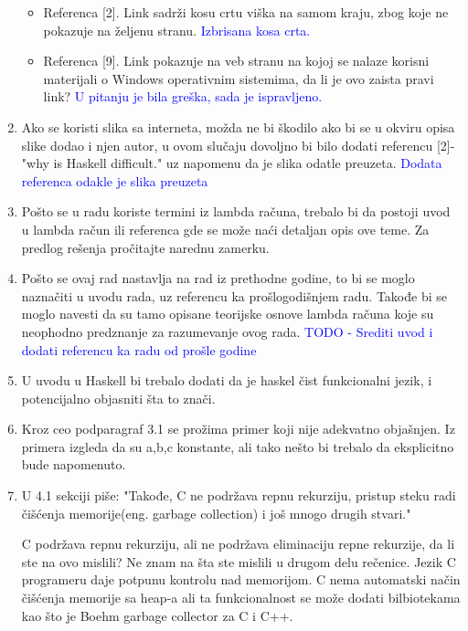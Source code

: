 \documentclass[a4paper]{report}
\newcommand{\odgovor}[1]{\textcolor{blue}{#1}}
\begin{document}
\begin{enumerate}
\begin{itemize}
			\item Referenca [2]. Link sadrži kosu crtu viška na samom kraju, zbog koje ne pokazuje na željenu stranu.
			\odgovor{Izbrisana kosa crta.}
			
			\item Referenca [9]. Link pokazuje na veb stranu na kojoj se nalaze korisni materijali o Windows operativnim sistemima, da li je ovo zaista pravi link?
			\odgovor{U pitanju je bila greška, sada je ispravljeno.}
			
		\end{itemize}
	\item Ako se koristi slika sa interneta, možda ne bi škodilo ako bi se u okviru opisa slike dodao i njen autor, u ovom slučaju dovoljno bi bilo dodati referencu [2]-"why is Haskell difficult." uz napomenu da je slika odatle preuzeta.
	\odgovor{Dodata referenca odakle je slika preuzeta}
	
	\item Pošto se u radu koriste termini iz lambda računa, trebalo bi da postoji uvod u lambda račun ili referenca gde se može naći detaljan opis ove teme. Za predlog rešenja pročitajte narednu zamerku.
	
	\item Pošto se ovaj rad nastavlja na rad iz prethodne godine, to bi se moglo naznačiti u uvodu rada, uz referencu ka prošlogodišnjem radu. Takođe bi se moglo navesti da su tamo opisane teorijske osnove lambda računa koje su neophodno predznanje za razumevanje ovog rada.
	\odgovor{TODO - Srediti uvod i dodati referencu ka radu od prošle godine}
	
	\item U uvodu u Haskell bi trebalo dodati da je haskel čist funkcionalni jezik, i potencijalno objasniti šta to znači.
	
	\item Kroz ceo podparagraf 3.1 se prožima primer koji nije adekvatno objašnjen. Iz primera izgleda da su a,b,c konstante, ali tako nešto bi trebalo da eksplicitno bude napomenuto.
	
	\item U 4.1 sekciji piše:
	"Takođe, C ne podržava repnu rekurziju, pristup steku radi čišćenja memorije(eng. garbage collection) i još mnogo drugih stvari."
	
	C podržava repnu rekurziju, ali ne podržava eliminaciju repne rekurzije, da li ste na ovo mislili? Ne znam na šta ste mislili u drugom delu rečenice. Jezik C programeru daje potpunu kontrolu nad memorijom. C nema automatski način čišćenja memorije sa heap-a ali ta funkcionalnost se može dodati bilbiotekama kao što je Boehm garbage collector za C i C++.
	

\end{enumerate}
\end{document}

